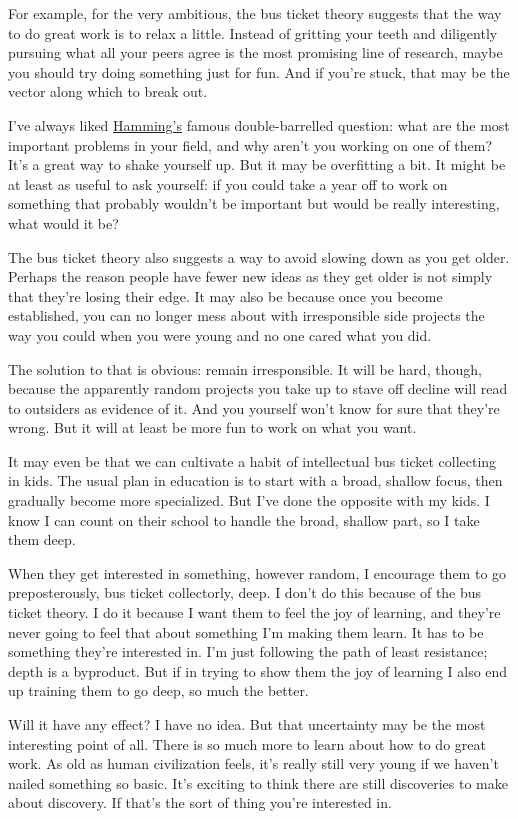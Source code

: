 \documentclass[12pt]{book}
\begin{document}
For example, for the very ambitious, the bus ticket theory suggests that
the way to do great work is to relax a little. Instead of gritting your
teeth and diligently pursuing what all your peers agree is the most
promising line of research, maybe you should try doing something just
for fun. And if you're stuck, that may be the vector along which to
break out.

I've always liked \href{hamming.html}{Hamming's} famous double-barrelled
question: what are the most important problems in your field, and why
aren't you working on one of them? It's a great way to shake yourself
up. But it may be overfitting a bit. It might be at least as useful to
ask yourself: if you could take a year off to work on something that
probably wouldn't be important but would be really interesting, what
would it be?

The bus ticket theory also suggests a way to avoid slowing down as you
get older. Perhaps the reason people have fewer new ideas as they get
older is not simply that they're losing their edge. It may also be
because once you become established, you can no longer mess about with
irresponsible side projects the way you could when you were young and no
one cared what you did.

The solution to that is obvious: remain irresponsible. It will be hard,
though, because the apparently random projects you take up to stave off
decline will read to outsiders as evidence of it. And you yourself won't
know for sure that they're wrong. But it will at least be more fun to
work on what you want.

It may even be that we can cultivate a habit of intellectual bus ticket
collecting in kids. The usual plan in education is to start with a
broad, shallow focus, then gradually become more specialized. But I've
done the opposite with my kids. I know I can count on their school to
handle the broad, shallow part, so I take them deep.

When they get interested in something, however random, I encourage them
to go preposterously, bus ticket collectorly, deep. I don't do this
because of the bus ticket theory. I do it because I want them to feel
the joy of learning, and they're never going to feel that about
something I'm making them learn. It has to be something they're
interested in. I'm just following the path of least resistance; depth is
a byproduct. But if in trying to show them the joy of learning I also
end up training them to go deep, so much the better.

Will it have any effect? I have no idea. But that uncertainty may be the
most interesting point of all. There is so much more to learn about how
to do great work. As old as human civilization feels, it's really still
very young if we haven't nailed something so basic. It's exciting to
think there are still discoveries to make about discovery. If that's the
sort of thing you're interested in.
\end{document}

